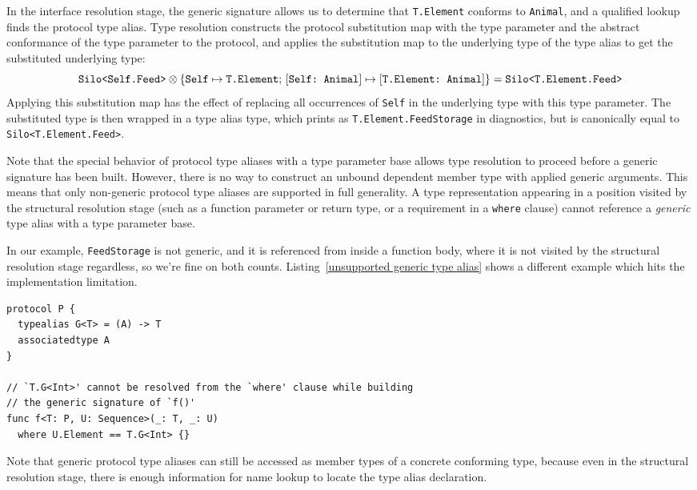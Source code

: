 \documentclass[../generics]{subfiles}
\begin{document}
In the interface resolution stage, the generic signature allows us to determine that \texttt{T.Element} conforms to \texttt{Animal}, and a qualified lookup finds the protocol type alias. Type resolution constructs the protocol substitution map with the type parameter and the abstract conformance of the type parameter to the protocol, and applies the substitution map to the underlying type of the type alias to get the substituted underlying type:
\[
\texttt{Silo<Self.Feed>} \otimes \{\texttt{Self} \mapsto \texttt{T.Element};\,[\texttt{Self:~Animal}] \mapsto [\texttt{T.Element:~Animal}]\} = \texttt{Silo<T.Element.Feed>}
\]
Applying this substitution map has the effect of replacing all occurrences of \texttt{Self} in the underlying type with this type parameter. The substituted type is then wrapped in a type alias type, which prints as \texttt{T.Element.FeedStorage} in diagnostics, but is canonically equal to \texttt{Silo<T.Element.Feed>}.

Note that the special behavior of protocol type aliases with a type parameter base allows type resolution to proceed before a generic signature has been built. However, there is no way to construct an unbound dependent member type with applied generic arguments. This means that only non-generic protocol type aliases are supported in full generality. A type representation appearing in a position visited by the structural resolution stage (such as a function parameter or return type, or a requirement in a \texttt{where} clause) cannot reference a \emph{generic} type alias with a type parameter base.

In our example, \texttt{FeedStorage} is not generic, and it is referenced from inside a function body, where it is not visited by the structural resolution stage regardless, so we're fine on both counts. Listing~\ref{unsupported generic type alias} shows a different example which hits the implementation limitation.
\begin{listing}\label{unsupported generic type alias}
\begin{Verbatim}
protocol P {
  typealias G<T> = (A) -> T
  associatedtype A
}

// `T.G<Int>' cannot be resolved from the `where' clause while building
// the generic signature of `f()'
func f<T: P, U: Sequence>(_: T, _: U)
  where U.Element == T.G<Int> {}
\end{Verbatim}
\end{listing}
Note that generic protocol type aliases can still be accessed as member types of a concrete conforming type, because even in the structural resolution stage, there is enough information for name lookup to locate the type alias declaration.
\end{document}
